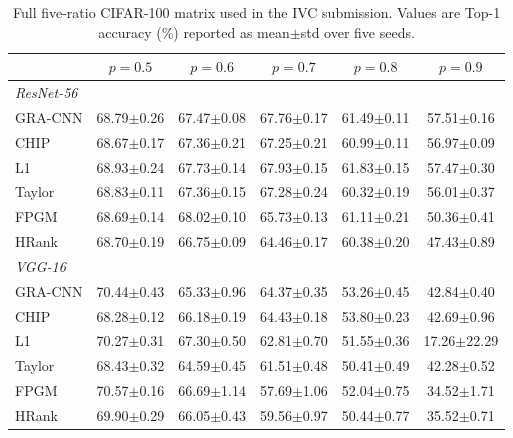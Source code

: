 \begin{table}[t]
\caption{Full five-ratio CIFAR-100 matrix used in the IVC submission. Values are Top-1 accuracy (\%) reported as mean$\pm$std over five seeds.}
\label{tab:full_cifar_matrix_ivc}
\scriptsize
\setlength{\tabcolsep}{4pt}
\begin{tabular*}{\textwidth}{@{\extracolsep\fill}lccccc}
\toprule
 & $p=0.5$ & $p=0.6$ & $p=0.7$ & $p=0.8$ & $p=0.9$ \\
\midrule
\multicolumn{6}{l}{\textit{ResNet-56}} \\
\midrule
GRA-CNN & 68.79$\pm$0.26 & 67.47$\pm$0.08 & 67.76$\pm$0.17 & 61.49$\pm$0.11 & 57.51$\pm$0.16 \\
CHIP & 68.67$\pm$0.17 & 67.36$\pm$0.21 & 67.25$\pm$0.21 & 60.99$\pm$0.11 & 56.97$\pm$0.09 \\
L1 & 68.93$\pm$0.24 & 67.73$\pm$0.14 & 67.93$\pm$0.15 & 61.83$\pm$0.15 & 57.47$\pm$0.30 \\
Taylor & 68.83$\pm$0.11 & 67.36$\pm$0.15 & 67.28$\pm$0.24 & 60.32$\pm$0.19 & 56.01$\pm$0.37 \\
FPGM & 68.69$\pm$0.14 & 68.02$\pm$0.10 & 65.73$\pm$0.13 & 61.11$\pm$0.21 & 50.36$\pm$0.41 \\
HRank & 68.70$\pm$0.19 & 66.75$\pm$0.09 & 64.46$\pm$0.17 & 60.38$\pm$0.20 & 47.43$\pm$0.89 \\
\midrule
\multicolumn{6}{l}{\textit{VGG-16}} \\
\midrule
GRA-CNN & 70.44$\pm$0.43 & 65.33$\pm$0.96 & 64.37$\pm$0.35 & 53.26$\pm$0.45 & 42.84$\pm$0.40 \\
CHIP & 68.28$\pm$0.12 & 66.18$\pm$0.19 & 64.43$\pm$0.18 & 53.80$\pm$0.23 & 42.69$\pm$0.96 \\
L1 & 70.27$\pm$0.31 & 67.30$\pm$0.50 & 62.81$\pm$0.70 & 51.55$\pm$0.36 & 17.26$\pm$22.29 \\
Taylor & 68.43$\pm$0.32 & 64.59$\pm$0.45 & 61.51$\pm$0.48 & 50.41$\pm$0.49 & 42.28$\pm$0.52 \\
FPGM & 70.57$\pm$0.16 & 66.69$\pm$1.14 & 57.69$\pm$1.06 & 52.04$\pm$0.75 & 34.52$\pm$1.71 \\
HRank & 69.90$\pm$0.29 & 66.05$\pm$0.43 & 59.56$\pm$0.97 & 50.44$\pm$0.77 & 35.52$\pm$0.71 \\
\bottomrule
\end{tabular*}
\end{table}
